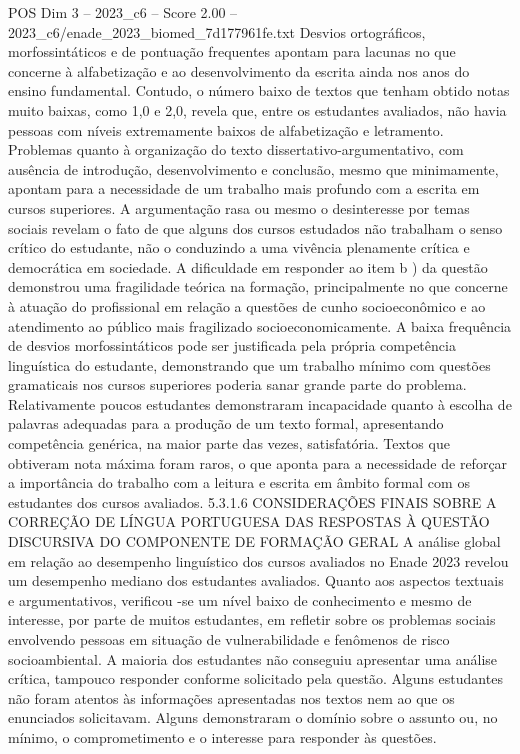 \begin{textsample}{POS Dim 3 – 2023\_c6 – Score 2.00 – 2023\_c6/enade\_2023\_biomed\_7d177961fe.txt}
Desvios ortográficos, morfossintáticos e de pontuação frequentes apontam para lacunas no que concerne à alfabetização e ao desenvolvimento da escrita ainda nos anos do ensino fundamental.
Contudo, o número baixo de textos que tenham obtido notas muito baixas, como 1,0 e 2,0, revela que, entre os estudantes avaliados, não havia pessoas com níveis extremamente baixos de alfabetização e letramento.
Problemas quanto à organização do texto dissertativo-argumentativo, com ausência de introdução, desenvolvimento e conclusão, mesmo que minimamente, apontam para a necessidade de um trabalho mais profundo com a escrita em cursos superiores.
A argumentação rasa ou mesmo o desinteresse por temas sociais revelam o fato de que alguns dos cursos estudados não trabalham o senso crítico do estudante, não o conduzindo a uma vivência plenamente crítica e democrática em sociedade.
A dificuldade em responder ao item b ) da questão demonstrou uma fragilidade teórica na formação, principalmente no que concerne à atuação do profissional em relação a questões de cunho socioeconômico e ao atendimento ao público mais fragilizado socioeconomicamente.
A baixa frequência de desvios morfossintáticos pode ser justificada pela própria competência linguística do estudante, demonstrando que um trabalho mínimo com questões gramaticais nos cursos superiores poderia sanar grande parte do problema.
Relativamente poucos estudantes demonstraram incapacidade quanto à escolha de palavras adequadas para a produção de um texto formal, apresentando competência genérica, na maior parte das vezes, satisfatória.
Textos que obtiveram nota máxima foram raros, o que aponta para a necessidade de reforçar a importância do trabalho com a leitura e escrita em âmbito formal com os estudantes dos cursos avaliados. 5.3.1.6 CONSIDERAÇÕES FINAIS SOBRE A CORREÇÃO DE LÍNGUA PORTUGUESA DAS RESPOSTAS À QUESTÃO DISCURSIVA DO COMPONENTE DE FORMAÇÃO GERAL A análise global em relação ao desempenho linguístico dos cursos avaliados no Enade 2023 revelou um desempenho mediano dos estudantes avaliados.
Quanto aos aspectos textuais e argumentativos, verificou -se um nível baixo de conhecimento e mesmo de interesse, por parte de muitos estudantes, em refletir sobre os problemas sociais envolvendo pessoas em situação de vulnerabilidade e fenômenos de risco socioambiental.
A maioria dos estudantes não conseguiu apresentar uma análise crítica, tampouco responder conforme solicitado pela questão.
Alguns estudantes não foram atentos às informações apresentadas nos textos nem ao que os enunciados solicitavam.
Alguns demonstraram o domínio sobre o assunto ou, no mínimo, o comprometimento e o interesse para responder às questões.

\end{textsample}
